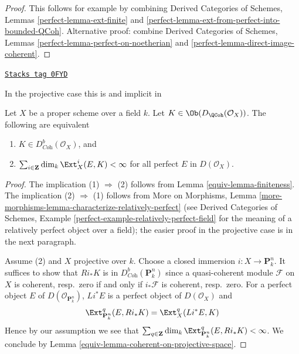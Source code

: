\begin{proof}
This follows for example by combining
Derived Categories of Schemes, Lemmas \ref{perfect-lemma-ext-finite} and
\ref{perfect-lemma-ext-from-perfect-into-bounded-QCoh}.
Alternative proof: combine
Derived Categories of Schemes, Lemmas
\ref{perfect-lemma-perfect-on-noetherian} and
\ref{perfect-lemma-direct-image-coherent}.
\end{proof}

\begin{lemma}
\label{equiv-lemma-characterize-dbcoh-projective}
\href{https://stacks.math.columbia.edu/tag/0FYD}{\texttt{Stacks tag 0FYD}}

\begin{reference}
In the projective case this is \cite[Lemma 7.46]{Rouquier-dimensions}
and implicit in \cite[Theorem A.1]{BvdB}
\end{reference}
Let $X$ be a proper scheme over a field $k$. Let
$K \in \Ob(D_\QCoh(\mathcal{O}_X))$. The following are equivalent
\begin{enumerate}
\item $K \in D^b_{\textit{Coh}}(\mathcal{O}_X)$, and
\item $\sum_{i \in \mathbf{Z}} \dim_k \Ext^i_X(E, K) < \infty$
for all perfect $E$ in $D(\mathcal{O}_X)$.
\end{enumerate}
\end{lemma}

\begin{proof}

The implication (1) $\Rightarrow$ (2) follows from
Lemma \ref{equiv-lemma-finiteness}.
The implication (2) $\Rightarrow$ (1) follows from
More on Morphisms, Lemma
\ref{more-morphisms-lemma-characterize-relatively-perfect}
(see Derived Categories of Schemes, Example
\ref{perfect-example-relatively-perfect-field}
for the meaning of a relatively perfect object over a field);
the easier proof in the projective case is in the next paragraph.

\medskip\noindent
Assume (2) and $X$ projective over $k$.
Choose a closed immersion $i : X \to \mathbf{P}^n_k$. It suffices to show
that $Ri_*K$ is in $D^b_{\textit{Coh}}(\mathbf{P}^n_k)$ since a quasi-coherent
module $\mathcal{F}$ on $X$ is coherent, resp.\ zero if and only if
$i_*\mathcal{F}$ is coherent, resp.\ zero. For a perfect object $E$
of $D(\mathcal{O}_{\mathbf{P}^n_k})$, $Li^*E$ is a perfect object of
$D(\mathcal{O}_X)$ and
$$
\Ext^q_{\mathbf{P}^n_k}(E, Ri_*K) = \Ext^q_X(Li^*E, K)
$$
Hence by our assumption we see that
$\sum_{q \in \mathbf{Z}} \dim_k \Ext^q_{\mathbf{P}^n_k}(E, Ri_*K) < \infty$.
We conclude by Lemma \ref{equiv-lemma-coherent-on-projective-space}.
\end{proof}

